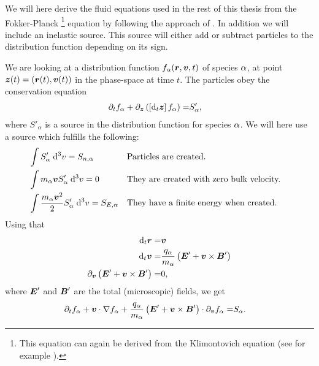 We will here derive the fluid equations used in the rest of this thesis from the Fokker-Planck%
\footnote{
    This equation can again be derived from the Klimontovich equation (see for example \cite{Klimontovich1983book}).
}
%
 equation by following the approach of \cite{Helander2002book}.
In addition we will include an inelastic source.
This source will either add or subtract particles to the distribution function depending on its sign.

We are looking at a distribution function $f_\alpha(\boldsymbol{r},\boldsymbol{v},t)$ of species $\alpha$, at point $\boldsymbol{z}(t)=(\boldsymbol{r}(t),\boldsymbol{v}(t))$ in the phase-space at time $t$.
The particles obey the conservation equation
%
\begin{align*}
    \partial_t f_\alpha + \partial_{\boldsymbol{z}} \left(\left[\text{d}_t \boldsymbol{z}\right]f_\alpha\right) =& S'_\alpha,
\end{align*}
%
where $S'_\alpha$ is a source in the distribution function for species $\alpha$.
We will here use a source which fulfills the following:
%
\begin{align*}
    &\int {S'_{\alpha}} \; \text{d} {^3v} = S_{n,\alpha}&
    &\text{Particles are created.}&
    \\
    &\int {m_\alpha\boldsymbol{v} S'_\alpha} \; \text{d} {^3v} = 0&
    &\text{They are created with zero bulk velocity.}&
    \\
    &\int {\frac{m_\alpha\boldsymbol{v}^2}{2} S'_\alpha} \; \text{d} {^3v} = S_{E,\alpha}&
    &\text{They have a finite energy when created.}&
\end{align*}
%
Using that
%
\begin{align*}
    \text{d}_t \boldsymbol{r}     =& \boldsymbol{v}\\
    \text{d}_t \boldsymbol{v}     =& \frac{q_\alpha}{m_\alpha}\left(\boldsymbol{E}'+\boldsymbol{v}\times\boldsymbol{B}'\right)\\
    \partial_{\boldsymbol{v}} \left(\boldsymbol{E}'+\boldsymbol{v}\times\boldsymbol{B}'\right) =& 0,
\end{align*}
%
where $\boldsymbol{E}'$ and $\boldsymbol{B}'$ are the total (microscopic) fields, we get
%
\begin{align*}
      \partial_t f_\alpha
    + \boldsymbol{v}\cdot\nabla f_\alpha
    + \frac{q_\alpha}{m_\alpha}
      \left(\boldsymbol{E}'+\boldsymbol{v}\times\boldsymbol{B}'\right)\cdot\partial_{\boldsymbol{v}}f_\alpha
    =& S_\alpha.
\end{align*}

